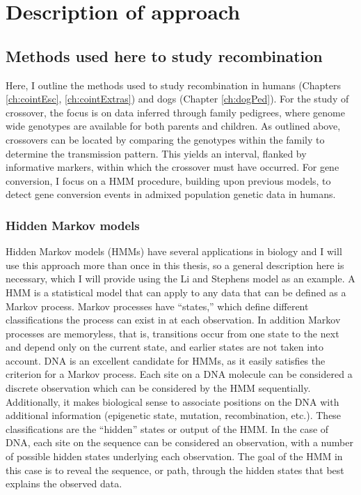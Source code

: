\section{Description of approach}

\subsection{Methods used here to study recombination}
Here, I outline the methods used to study recombination in humans (Chapters \ref{ch:cointEsc}, \ref{ch:cointExtras}) and dogs (Chapter \ref{ch:dogPed}).
For the study of crossover, the focus is on data inferred through family pedigrees, where genome wide genotypes are available for both parents and children.
As outlined above, crossovers can be located by comparing the genotypes within the family to determine the transmission pattern.
This yields an interval, flanked by informative markers, within which the crossover must have occurred.
For gene conversion, I focus on a HMM procedure, building upon previous models, to detect gene conversion events in admixed population genetic data in humans.


\subsubsection{Hidden Markov models}
Hidden Markov models (HMMs) have several applications in biology and I will use this approach more than once in this thesis, so a general description here is necessary, which I will provide using the Li and Stephens model as an example.
A HMM is a statistical model that can apply to any data that can be defined as a Markov process.
Markov processes have ``states,'' which define different classifications the process can exist in at each observation.
In addition Markov processes are memoryless, that is, transitions occur from one state to the next and depend only on the current state, and earlier states are not taken into account.
DNA is an excellent candidate for HMMs, as it easily satisfies the criterion for a Markov process.
Each site on a DNA molecule can be considered a discrete observation which can be considered by the HMM sequentially.
Additionally, it makes biological sense to associate positions on the DNA with additional information (epigenetic state, mutation, recombination, etc.).
These classifications are the ``hidden'' states or output of the HMM.
In the case of DNA, each site on the sequence can be considered an observation, with a number of possible hidden states underlying each observation.
The goal of the HMM in this case is to reveal the sequence, or path, through the hidden states that best explains the observed data.






